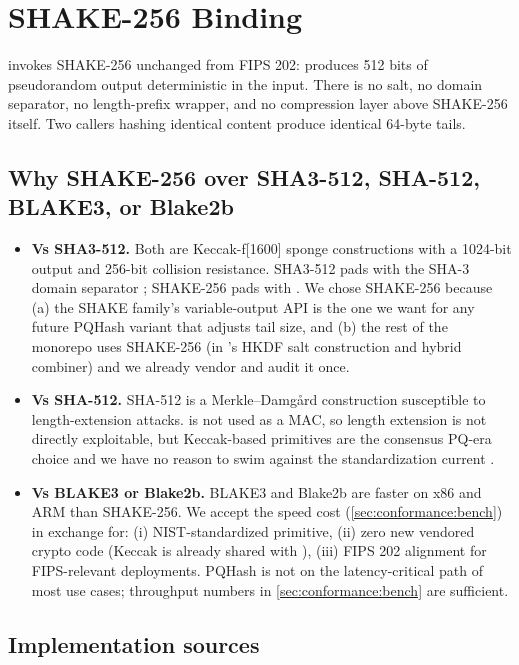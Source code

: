 \section{SHAKE-256 Binding}
\label{sec:shake256}

\pqhash{} invokes SHAKE-256 \citep{fips202} unchanged from FIPS 202:  produces 512 bits of pseudorandom output deterministic in the input. There is no salt, no domain separator, no length-prefix wrapper, and no compression layer above SHAKE-256 itself. Two callers hashing identical content produce identical 64-byte tails.

\subsection{Why SHAKE-256 over SHA3-512, SHA-512, BLAKE3, or Blake2b}

\begin{itemize}
  \item \textbf{Vs SHA3-512.} Both are Keccak-f[1600] sponge constructions with a 1024-bit output and 256-bit collision resistance. SHA3-512 \citep{fips202} pads with the SHA-3 domain separator ; SHAKE-256 pads with . We chose SHAKE-256 because (a) the SHAKE family's variable-output API is the one we want for any future PQHash variant that adjusts tail size, and (b) the rest of the \pqtoolkit{} monorepo uses SHAKE-256 (in \pqcrypt{}'s HKDF salt construction and hybrid combiner) and we already vendor and audit it once.
  \item \textbf{Vs SHA-512.} SHA-512 is a Merkle--Damg{\aa}rd construction susceptible to length-extension attacks. \pqhash{} is not used as a MAC, so length extension is not directly exploitable, but Keccak-based primitives are the consensus PQ-era choice and we have no reason to swim against the standardization current \citep{fips202}.
  \item \textbf{Vs BLAKE3 or Blake2b.} BLAKE3 and Blake2b are faster on x86 and ARM than SHAKE-256. We accept the speed cost (\cref{sec:conformance:bench}) in exchange for: (i) NIST-standardized primitive, (ii) zero new vendored crypto code (Keccak is already shared with \pqcrypt{}), (iii) FIPS 202 alignment for FIPS-relevant deployments. PQHash is not on the latency-critical path of most use cases; throughput numbers in \cref{sec:conformance:bench} are sufficient.
\end{itemize}

\subsection{Implementation sources}


